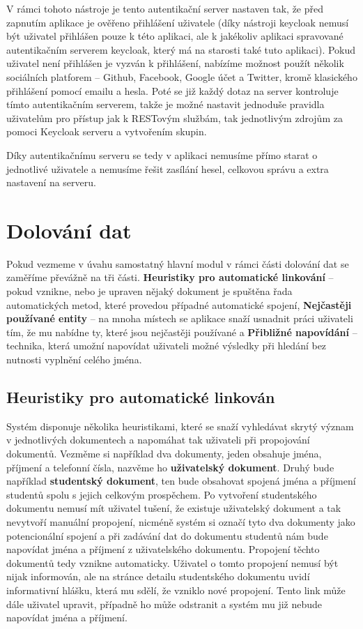 \par V rámci tohoto nástroje je tento autentikační server nastaven tak, že před zapnutím aplikace je ověřeno přihlášení uživatele (díky nástroji keycloak nemusí být uživatel přihlášen pouze k této aplikaci, ale k jakékoliv aplikaci spravované autentikačním serverem keycloak, který má na starosti také tuto aplikaci). Pokud uživatel není přihlášen je vyzván k přihlášení, nabízíme možnost použít několik sociálních platforem -- Github, Facebook, Google účet a Twitter, kromě klasického přihlášení pomocí emailu a hesla. Poté se již každý dotaz na server kontroluje tímto autentikačním serverem, takže je možné nastavit jednoduše pravidla uživatelům pro přístup jak k RESTovým službám, tak jednotlivým zdrojům za pomoci Keycloak serveru a vytvořením skupin.

\par Díky autentikačnímu serveru se tedy v aplikaci nemusíme přímo starat o jednotlivé uživatele a nemusíme řešit zasílání hesel, celkovou správu a extra nastavení na serveru.

\section{Dolování dat}
\par Pokud vezmeme v úvahu samostatný hlavní modul v rámci části dolování dat se zaměříme převážně na tři části. \textbf{Heuristiky pro automatické linkování} -- pokud vznikne, nebo je upraven nějaký dokument je spuštěna řada automatických metod, které provedou případné automatické spojení, \textbf{Nejčastěji používané entity} -- na mnoha místech se aplikace snaží usnadnit práci uživateli tím, že mu nabídne ty, které jsou nejčastěji používané a \textbf{Přibližné napovídání} -- technika, která umožní napovídat uživateli možné výsledky při hledání bez nutnosti vyplnění celého jména.

\subsection{Heuristiky pro automatické linkován}
\par Systém disponuje několika heuristikami, které se snaží vyhledávat skrytý význam v jednotlivých dokumentech a napomáhat tak uživateli při propojování dokumentů. Vezměme si například dva dokumenty, jeden obsahuje jména, příjmení a telefonní čísla, nazvěme ho \textbf{uživatelský dokument}. Druhý bude například \textbf{studentský dokument}, ten bude obsahovat spojená jména a příjmení studentů spolu s jejich celkovým prospěchem. Po vytvoření studentského dokumentu nemusí mít uživatel tušení, že existuje uživatelský dokument a tak nevytvoří manuální propojení, nicméně systém si označí tyto dva dokumenty jako potencionální spojení a při zadávání dat do dokumentu studentů nám bude napovídat jména a příjmení z uživatelského dokumentu. Propojení těchto dokumentů tedy vznikne automaticky. Uživatel o tomto propojení nemusí být nijak informován, ale na stránce detailu studentského dokumentu uvidí informativní hlášku, která mu sdělí, že vzniklo nové propojení. Tento link může dále uživatel upravit, případně ho může odstranit a systém mu již nebude napovídat jména a příjmení.

